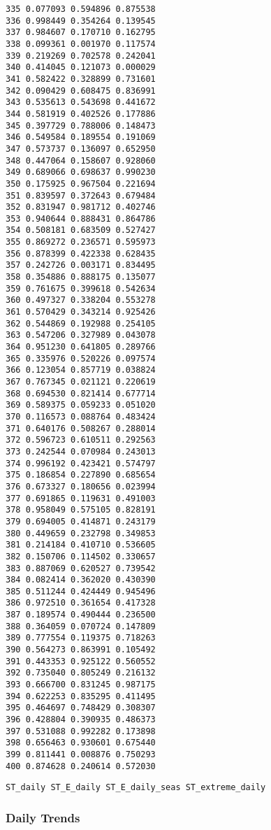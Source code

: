 \documentclass[
  10pt,
  a4paper,oneside]{article}
\begin{document}
\begin{verbatim}
335 0.077093 0.594896 0.875538
336 0.998449 0.354264 0.139545
337 0.984607 0.170710 0.162795
338 0.099361 0.001970 0.117574
339 0.219269 0.702578 0.242041
340 0.414045 0.121073 0.000029
341 0.582422 0.328899 0.731601
342 0.090429 0.608475 0.836991
343 0.535613 0.543698 0.441672
344 0.581919 0.402526 0.177886
345 0.397729 0.788006 0.148473
346 0.549584 0.189554 0.191069
347 0.573737 0.136097 0.652950
348 0.447064 0.158607 0.928060
349 0.689066 0.698637 0.990230
350 0.175925 0.967504 0.221694
351 0.839597 0.372643 0.679484
352 0.831947 0.981712 0.402746
353 0.940644 0.888431 0.864786
354 0.508181 0.683509 0.527427
355 0.869272 0.236571 0.595973
356 0.878399 0.422338 0.628435
357 0.242726 0.003171 0.834495
358 0.354886 0.888175 0.135077
359 0.761675 0.399618 0.542634
360 0.497327 0.338204 0.553278
361 0.570429 0.343214 0.925426
362 0.544869 0.192988 0.254105
363 0.547206 0.327989 0.043078
364 0.951230 0.641805 0.289766
365 0.335976 0.520226 0.097574
366 0.123054 0.857719 0.038824
367 0.767345 0.021121 0.220619
368 0.694530 0.821414 0.677714
369 0.589375 0.059233 0.051020
370 0.116573 0.088764 0.483424
371 0.640176 0.508267 0.288014
372 0.596723 0.610511 0.292563
373 0.242544 0.070984 0.243013
374 0.996192 0.423421 0.574797
375 0.186854 0.227890 0.685654
376 0.673327 0.180656 0.023994
377 0.691865 0.119631 0.491003
378 0.958049 0.575105 0.828191
379 0.694005 0.414871 0.243179
380 0.449659 0.232798 0.349853
381 0.214184 0.410710 0.536605
382 0.150706 0.114502 0.330657
383 0.887069 0.620527 0.739542
384 0.082414 0.362020 0.430390
385 0.511244 0.424449 0.945496
386 0.972510 0.361654 0.417328
387 0.189574 0.490444 0.236500
388 0.364059 0.070724 0.147809
389 0.777554 0.119375 0.718263
390 0.564273 0.863991 0.105492
391 0.443353 0.925122 0.560552
392 0.735040 0.805249 0.216132
393 0.666700 0.831245 0.987175
394 0.622253 0.835295 0.411495
395 0.464697 0.748429 0.308307
396 0.428804 0.390935 0.486373
397 0.531088 0.992282 0.173898
398 0.656463 0.930601 0.675440
399 0.811441 0.008876 0.750293
400 0.874628 0.240614 0.572030
\end{verbatim}

\begin{verbatim}
ST_daily ST_E_daily ST_E_daily_seas ST_extreme_daily
\end{verbatim}

\newpage
\FloatBarrier

\hypertarget{daily-trends}{%
\subsubsection{Daily Trends}\label{daily-trends}}
\end{document}
